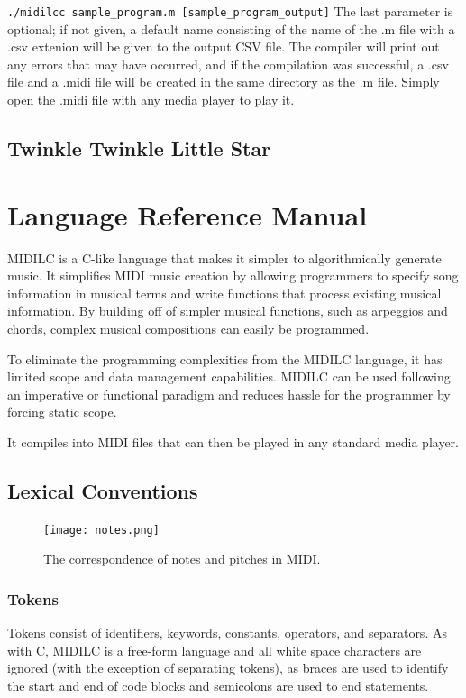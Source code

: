 \documentclass[12pt,A4]{book}
\begin{document}
\verb|./midilcc sample_program.m [sample_program_output]|
The last parameter is optional; if not given, a default name consisting of the name of the .m file with a .csv extenion will be given to the output CSV file. The compiler will print out any errors that may have occurred, and if the compilation was successful, a .csv file and a .midi file will be created in the same directory as the .m file. Simply open the .midi file with any media player to play it.
\section{Twinkle Twinkle Little Star}
\chapter{Language Reference Manual}

MIDILC is a C-like language that makes it simpler to algorithmically generate music.  It simplifies MIDI music creation by allowing programmers to specify song information in musical terms and write functions that process existing musical information.  By building off of simpler musical functions, such as arpeggios and chords, complex musical compositions can easily be programmed.

To eliminate the programming complexities from the MIDILC language, it has limited scope and data management capabilities.  MIDILC can be used following an imperative or functional paradigm and reduces hassle for the programmer by forcing static scope.

It compiles into MIDI files that can then be played in any standard media player.

\section{Lexical Conventions}
\begin{figure}
\center
\texttt{[image: notes.png]}
\label{fig:pitches_and_notes}
\caption{The correspondence of notes and pitches in MIDI. }
\end{figure}
\subsection{Tokens}
Tokens consist of identifiers, keywords, constants, operators, and separators.  As with C, MIDILC is a free-form language and all white space characters are ignored (with the exception of separating tokens), as braces are used to identify the start and end of code blocks and semicolons are used to end statements.
\end{document}
